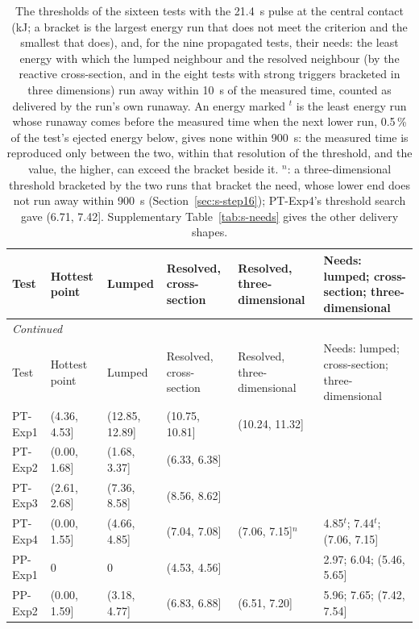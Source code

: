 {\footnotesize\setlength{\tabcolsep}{3pt}
\begin{longtable}{p{}p{}p{}p{}p{}p{}}
\caption{The thresholds of the sixteen tests with the 21.4~s pulse at the central contact (kJ; a bracket is the largest energy run that does not meet the criterion and the smallest that does), and, for the nine propagated tests, their needs: the least energy with which the lumped neighbour and the resolved neighbour (by the reactive cross-section, and in the eight tests with strong triggers bracketed in three dimensions) run away within 10~s of the measured time, counted as delivered by the run's own runaway. An energy marked $^{t}$ is the least energy run whose runaway comes before the measured time when the next lower run, 0.5\,\% of the test's ejected energy below, gives none within 900~s: the measured time is reproduced only between the two, within that resolution of the threshold, and the value, the higher, can exceed the bracket beside it. $^{n}$: a three-dimensional threshold bracketed by the two runs that bracket the need, whose lower end does not run away within 900~s (Section~\ref{sec:s-step16}); PT-Exp4's threshold search gave (6.71, 7.42]. Supplementary Table~\ref{tab:s-needs} gives the other delivery shapes.}\label{tab:s-thresholds}\\
\toprule
Test & Hottest point & Lumped & Resolved, cross-section & Resolved, three-dimensional & Needs: lumped; cross-section; three-dimensional \\
\midrule
\endfirsthead
\multicolumn{6}{l}{\textit{Continued}} \\
\toprule
Test & Hottest point & Lumped & Resolved, cross-section & Resolved, three-dimensional & Needs: lumped; cross-section; three-dimensional \\
\midrule
\endhead
PT-Exp1 & (4.36, 4.53] & (12.85, 12.89] & (10.75, 10.81] & (10.24, 11.32] &  \\
PT-Exp2 & (0.00, 1.68] & (1.68, 3.37] & (6.33, 6.38] &  &  \\
PT-Exp3 & (2.61, 2.68] & (7.36, 8.58] & (8.56, 8.62] &  &  \\
PT-Exp4 & (0.00, 1.55] & (4.66, 4.85] & (7.04, 7.08] & (7.06, 7.15]$^{n}$ & 4.85$^{t}$; 7.44$^{t}$; (7.06, 7.15] \\
PP-Exp1 & 0 & 0 & (4.53, 4.56] &  & 2.97; 6.04; (5.46, 5.65] \\
PP-Exp2 & (0.00, 1.59] & (3.18, 4.77] & (6.83, 6.88] & (6.51, 7.20] & 5.96; 7.65; (7.42, 7.54] \\

\end{longtable}}
